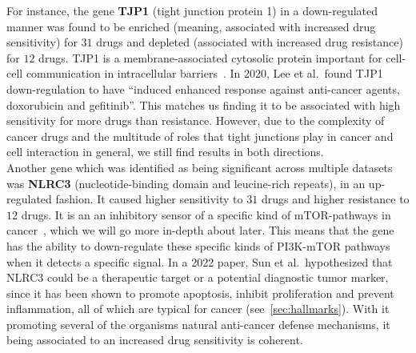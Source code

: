 For instance, the gene \textbf{TJP1} (tight junction protein 1) in a down-regulated manner was found to be enriched (meaning, associated with increased drug sensitivity) for $31$ drugs and depleted (associated with increased drug resistance) for $12$ drugs. TJP1 is a membrane-associated cytosolic protein important for cell-cell communication in intracellular barriers~\cite{TJP1_Lee}. In 2020, Lee et al.\ found TJP1 down-regulation to have ``induced enhanced response against anti-cancer agents, doxorubicin and gefitinib''. This matches us finding it to be associated with high sensitivity for more drugs than resistance. However, due to the complexity of cancer drugs and the multitude of roles that tight junctions play in cancer and cell interaction in general, we still find results in both directions.\\
Another gene which was identified as being significant across multiple datasets was \textbf{NLRC3} (nucleotide-binding domain and leucine-rich repeats), in an up-regulated fashion. It caused higher sensitivity to $31$ drugs and higher resistance to $12$ drugs. It is an an inhibitory sensor of a specific kind of mTOR-pathways in cancer~\cite{nlrc3}, which we will go more in-depth about later. This means that the gene has the ability to down-regulate these specific kinds of PI3K-mTOR pathways when it detects a specific signal. In a 2022 paper, Sun et al.\ hypothesized that NLRC3 could be a therapeutic target or a potential diagnostic tumor marker, since it has been shown to promote apoptosis, inhibit proliferation and prevent inflammation, all of which are typical for cancer (see~\ref{sec:hallmarks}). With it promoting several of the organisms natural anti-cancer defense mechanisms, it being associated to an increased drug sensitivity is coherent.\\
